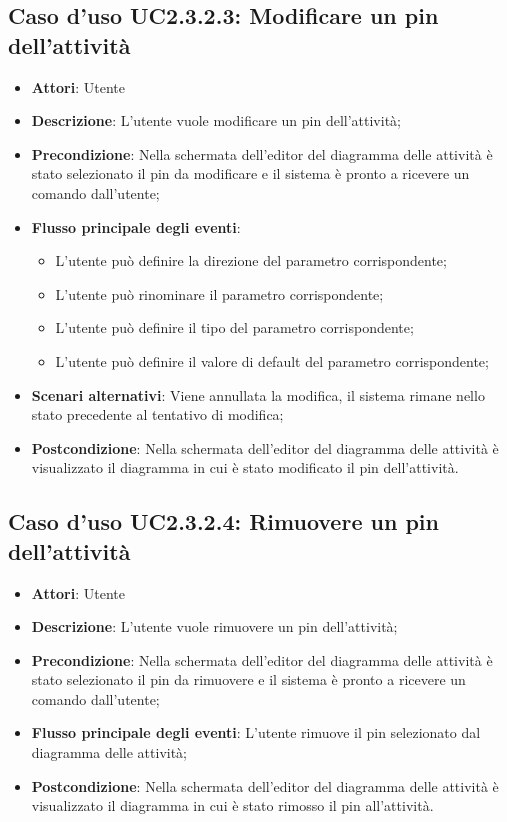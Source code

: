\documentclass[../AnalisiDeiRequisiti.tex]{subfiles}
\begin{document}
				\subsection{Caso d'uso UC2.3.2.3: Modificare un pin dell'attività}
				\begin{itemize}
					\item \textbf{Attori}: Utente
					\item \textbf{Descrizione}: L'utente vuole modificare un pin dell'attività;
					\item \textbf{Precondizione}: Nella schermata dell'editor del diagramma delle attività è stato selezionato il pin da modificare e il sistema è pronto a ricevere un comando dall'utente;
					\item \textbf{Flusso principale degli eventi}: \begin{itemize}
						\item L'utente può definire la direzione del parametro corrispondente;
						\item L'utente può rinominare il parametro corrispondente;
						\item L'utente può definire il tipo del parametro corrispondente;
						\item L'utente può definire il valore di default del parametro corrispondente;
					\end{itemize}
						\item \textbf{Scenari alternativi}: Viene annullata la modifica, il sistema rimane nello stato precedente al tentativo di modifica;
						\item \textbf{Postcondizione}: Nella schermata dell'editor del diagramma delle attività è visualizzato il diagramma in cui è stato modificato il pin dell'attività.
					\end{itemize}
					\subsection{Caso d'uso UC2.3.2.4: Rimuovere un pin dell'attività}
					\begin{itemize}
						\item \textbf{Attori}: Utente
						\item \textbf{Descrizione}: L'utente vuole rimuovere un pin dell'attività;
						\item \textbf{Precondizione}: Nella schermata dell'editor del diagramma delle attività è stato selezionato il pin da rimuovere e il sistema è pronto a ricevere un comando dall'utente;
						\item \textbf{Flusso principale degli eventi}: L'utente rimuove il pin selezionato dal diagramma delle attività;
						\item \textbf{Postcondizione}: Nella schermata dell'editor del diagramma delle attività è visualizzato il diagramma in cui è stato rimosso il pin all'attività.
					\end{itemize}
\end{document}
